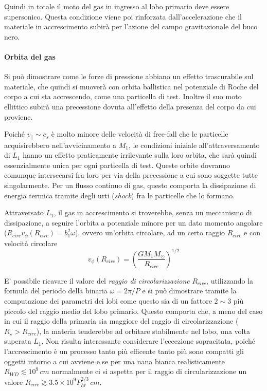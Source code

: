 \documentclass[a4paperbi]{article}
\begin{document}
	Quindi in totale il moto del gas in ingresso al lobo primario deve essere supersonico. Questa condizione viene poi rinforzata dall'accelerazione che il materiale in accrescimento subirà per l'azione del campo gravitazionale del buco nero.

	\paragraph{Orbita del gas}	
	Si può dimostrare come le forze di pressione abbiano un effetto trascurabile sul materiale, che quindi si muoverà con orbita ballistica nel potenziale di Roche del corpo a cui sta accrescendo, come una particella di test. Inoltre il suo moto ellittico subirà una precessione dovuta all'effetto della presenza del corpo da cui proviene.
	
	Poiché $v_\parallel\sim c_s$ è molto minore delle velocità di free-fall che le particelle acquisirebbero nell'avvicinamento a $M_1$, le condizioni iniziale all'attraversamento di $L_1$ hanno un effetto praticamente irrilevante sulla loro orbita, che sarà quindi essenzialmente unica per ogni particella di test. Queste orbite dovranno comunque intersecarsi fra loro per via della precessione a cui sono soggette tutte singolarmente. Per un flusso continuo di gas, questo comporta la dissipazione di energia termica tramite degli urti (\textit{shock}) fra le particelle che lo formano. 
	
	Attraversato $L_1$, il gas in accrescimento si troverebbe, senza un meccanismo di dissipazione, a seguire l'orbita a potenziale minore per un dato momento angolare ($R_{circ}v_\phi(R_{circ})=b_1^2\omega$), ovvero un'orbita circolare, ad un certo raggio $R_{circ}$ e con velocità circolare
	\begin{equation}
		v_\phi(R_{circ})=\left(\frac{GM_1M_\odot}{R_{circ}}\right)^{1/2}
	\end{equation}
	
	E' possibile ricavare il valore del \textit{raggio di circolarizzazione} $R_{circ}$, utilizzando la formula del periodo della binaria $\omega=2\pi/P$ e si può dimostrare tramite la computazione dei parametri dei lobi come questo sia di un fattore $2\sim3$ più piccolo del raggio medio del lobo primario. Questo comporta che, a meno del caso in cui il raggio della primaria sia maggiore del raggio di circolarizzazione ($R_\star>R_{circ}$), la materia tenderebbe ad orbitare stabilmente nel lobo, una volta superata $L_1$.
	Non risulta interessante considerare l'eccezione sopracitata, poiché l'accrescimento è un processo tanto più efficente tanto più sono compatti gli oggetti intorno a cui avviene e se per una nana bianca realisticamente $R_{WD}\lesssim10^9\,cm$ normalmente ci si aspetta per il raggio di circularizzazione un valore $R_{circ}\gtrsim3.5\times10^9P_{hr}^{2/3}\,cm$.
\end{document}
